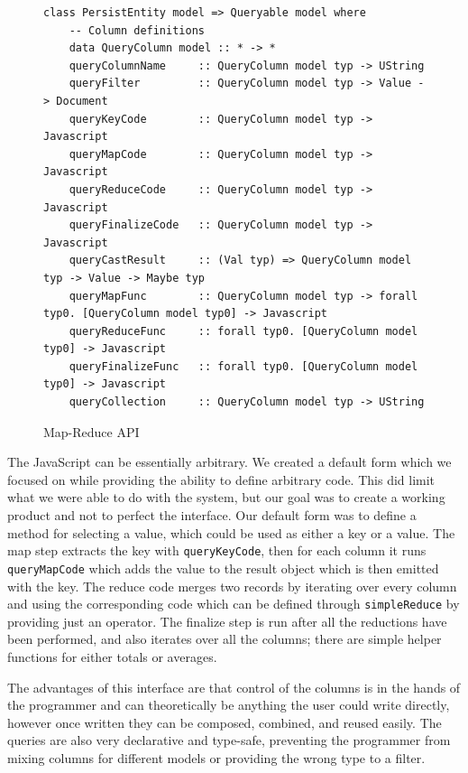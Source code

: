 \documentclass{chi2009}
\newcommand{\code}[1]{\texttt{#1}}
\begin{document}
\begin{figure}[t]
\begin{verbatim}
class PersistEntity model => Queryable model where
    -- Column definitions
    data QueryColumn model :: * -> *
    queryColumnName     :: QueryColumn model typ -> UString
    queryFilter         :: QueryColumn model typ -> Value -> Document
    queryKeyCode        :: QueryColumn model typ -> Javascript
    queryMapCode        :: QueryColumn model typ -> Javascript
    queryReduceCode     :: QueryColumn model typ -> Javascript
    queryFinalizeCode   :: QueryColumn model typ -> Javascript
    queryCastResult     :: (Val typ) => QueryColumn model typ -> Value -> Maybe typ
    queryMapFunc        :: QueryColumn model typ -> forall typ0. [QueryColumn model typ0] -> Javascript
    queryReduceFunc     :: forall typ0. [QueryColumn model typ0] -> Javascript
    queryFinalizeFunc   :: forall typ0. [QueryColumn model typ0] -> Javascript
    queryCollection     :: QueryColumn model typ -> UString
\end{verbatim}
    \caption{Map-Reduce API}
    \label{queryable}
\end{figure}

The JavaScript can be essentially arbitrary.  We created a default form which we focused on while providing the ability to define arbitrary code.  This did limit what we were able to do with the system, but our goal was to create a working product and not to perfect the interface.  Our default form was to define a method for selecting a value, which could be used as either a key or a value.  The map step extracts the key with \code{queryKeyCode}, then for each column it runs \code{queryMapCode} which adds the value to the result object which is then emitted with the key.  The reduce code merges two records by iterating over every column and using the corresponding code which can be defined through \code{simpleReduce} by providing just an operator.  The finalize step is run after all the reductions have been performed, and also iterates over all the columns; there are simple helper functions for either totals or averages.

The advantages of this interface are that control of the columns is in the hands of the programmer and can theoretically be anything the user could write directly, however once written they can be composed, combined, and reused easily.  The queries are also very declarative and type-safe, preventing the programmer from mixing columns for different models or providing the wrong type to a filter.
\end{document}
